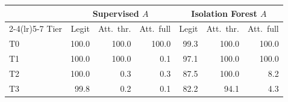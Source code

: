\begin{tabular}{@{}lrrrrrr@{}}
\toprule
 & \multicolumn{3}{c}{Supervised $A$} & \multicolumn{3}{c}{Isolation Forest $A$} \\
\cmidrule(lr){2-4}\cmidrule(lr){5-7}
Tier & Legit & Att.\ thr. & Att.\ full & Legit & Att.\ thr. & Att.\ full \\
\midrule
T0 & 100.0 & 100.0 & 100.0 & 99.3 & 100.0 & 100.0 \\
T1 & 100.0 & 100.0 & 0.1 & 97.1 & 100.0 & 100.0 \\
T2 & 100.0 & 0.3 & 0.3 & 87.5 & 100.0 & 8.2 \\
T3 & 99.8 & 0.2 & 0.1 & 82.2 & 94.1 & 4.3 \\
\bottomrule
\end{tabular}